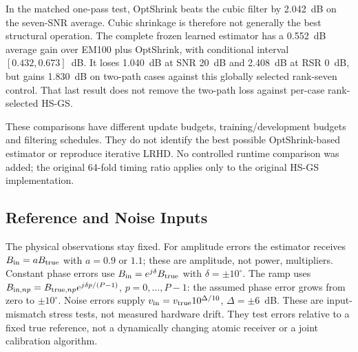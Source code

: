 In the matched one-pass test, OptShrink beats the cubic filter by
2.042~dB on the seven-SNR average. Cubic shrinkage is therefore not
generally the best structural operation. The complete frozen learned
estimator has a 0.552~dB average gain over EM100 plus OptShrink, with
conditional interval $[0.432,0.673]$~dB. It loses 1.040~dB at SNR 20~dB
and 2.408~dB at RSR 0~dB, but gains 1.830~dB on two-path cases against
this globally selected rank-seven control. That last result does not
remove the two-path loss against per-case rank-selected HS-GS.

These comparisons have different update budgets, training/development
budgets and filtering schedules. They do not identify the best possible
OptShrink-based estimator or reproduce iterative LRHD. No controlled
runtime comparison was added; the original 64-fold timing ratio applies
only to the original HS-GS implementation.

\subsection{Reference and Noise Inputs}
The physical observations stay fixed. For amplitude errors the estimator
receives $B_{\rm in}=aB_{\rm true}$ with $a=0.9$ or $1.1$; these are
amplitude, not power, multipliers. Constant phase errors use
$B_{\rm in}=e^{j\delta}B_{\rm true}$ with $\delta=\pm10^\circ$.
The ramp uses $B_{{\rm in},np}=B_{{\rm true},np}
e^{j\delta p/(P-1)}$, $p=0,\ldots,P-1$: the assumed phase error grows
from zero to $\pm10^\circ$. Noise errors supply
$v_{\rm in}=v_{\rm true}10^{\Delta/10}$, $\Delta=\pm6$~dB.
These are input-mismatch stress tests, not measured hardware drift.
They test errors relative to a fixed true reference, not a dynamically
changing atomic receiver or a joint calibration algorithm.

